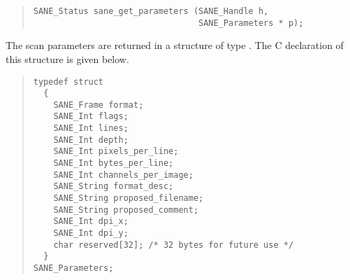 \documentclass[11pt,DVIps]{report}
\begin{document}
\begin{quote}
\begin{verbatim}
SANE_Status sane_get_parameters (SANE_Handle h,
                                 SANE_Parameters * p);
\end{verbatim}
\end{quote}

The scan parameters are returned in a structure of type
.  The C declaration of this structure
is given below.
\begin{changebar}
\begin{quote}
\begin{verbatim}
typedef struct
  {
    SANE_Frame format;
    SANE_Int flags;
    SANE_Int lines;
    SANE_Int depth;
    SANE_Int pixels_per_line;
    SANE_Int bytes_per_line;
    SANE_Int channels_per_image;
    SANE_String format_desc;
    SANE_String proposed_filename;
    SANE_String proposed_comment;
    SANE_Int dpi_x;
    SANE_Int dpi_y;
    char reserved[32]; /* 32 bytes for future use */
  }
SANE_Parameters;
\end{verbatim}
\end{quote}
\end{changebar}
\end{document}
